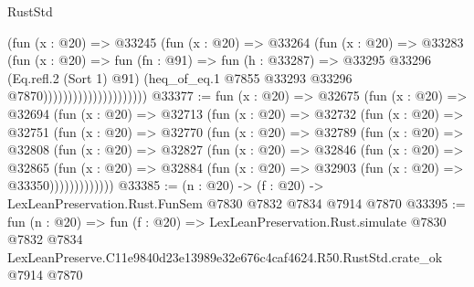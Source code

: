 \begin{lexlean}{RustStd}
\begin{coremodule}
                                    (fun (x : @20) =>
                                    @33245
                                      (fun (x : @20) =>
                                      @33264
                                        (fun (x : @20) =>
                                        @33283
                                          (fun (x : @20) =>
                                          fun (fn : @91) =>
                                          fun (h : @33287) =>
                                          @33295
                                            @33296
                                            (Eq.refl.{2} (Sort 1) @91)
                                            (heq_of_eq.{1}
                                              @7855
                                              @33293
                                              @33296
                                              @7870)))))))))))))))))))))
@33377 := fun (x : @20) =>
  @32675
    (fun (x : @20) =>
    @32694
      (fun (x : @20) =>
      @32713
        (fun (x : @20) =>
        @32732
          (fun (x : @20) =>
          @32751
            (fun (x : @20) =>
            @32770
              (fun (x : @20) =>
              @32789
                (fun (x : @20) =>
                @32808
                  (fun (x : @20) =>
                  @32827
                    (fun (x : @20) =>
                    @32846
                      (fun (x : @20) =>
                      @32865
                        (fun (x : @20) =>
                        @32884 (fun (x : @20) => @32903 (fun (x : @20) => @33350)))))))))))))
@33385 := (n : @20) -> (f : @20) -> LexLeanPreservation.Rust.FunSem @7830 @7832 @7834 @7914 @7870
@33395 := fun (n : @20) =>
  fun (f : @20) =>
  LexLeanPreservation.Rust.simulate
    @7830
    @7832
    @7834
    LexLeanPreserve.C11e9840d23e13989e32e676c4caf4624.R50.RustStd.crate_ok
    @7914
    @7870
\end{coremodule}
\end{lexlean}
